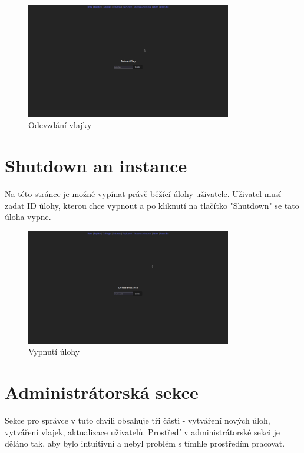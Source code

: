 \documentclass[12pt, a4paper,
oneside,      %
openright
]{report}
\begin{document}
\begin{figure}[h]
	\centering
	\includegraphics[width=0.8\textwidth]{05-flag.png}
	\caption{Odevzdání vlajky}
	\label{fig:frontend-flag-submit}
\end{figure}

\section{Shutdown an instance}
Na této stránce je možné vypínat právě běžící úlohy uživatele. Uživatel musí zadat ID úlohy, kterou chce vypnout a po kliknutí na tlačítko "Shutdown" se tato úloha vypne.

\begin{figure}[h]
	\centering
	\includegraphics[width=0.8\textwidth]{06-shut.png}
	\caption{Vypnutí úlohy}
	\label{fig:frontend-shutdown}
\end{figure}

\section{Administrátorská sekce}
Sekce pro správce v tuto chvíli obsahuje tři části - vytváření nových úloh, vytváření vlajek, aktualizace uživatelů. Prostředí v administrátorské sekci je děláno tak, aby bylo intuitivní a nebyl problém s tímhle prostředím pracovat. 
\end{document}
